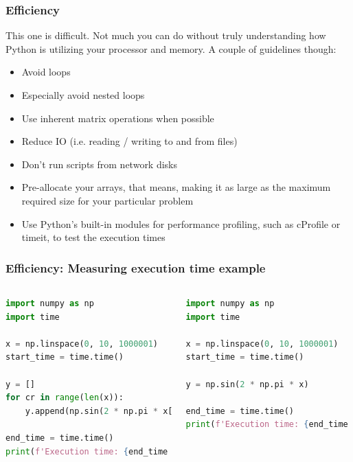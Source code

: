 \begin{frame}[fragile]
  \frametitle{Efficiency}
  This one is difficult. Not much you can do without truly understanding how Python is utilizing your processor and memory. A couple of guidelines though:
  \begin{itemize}
      \item Avoid loops
      \item Especially avoid nested loops
      \item Use inherent matrix operations when possible
      \item Reduce IO (i.e. reading / writing to and from files)
      \item Don't run scripts from network disks
      \item Pre-allocate your arrays, that means, making it as large as the maximum required size for your particular problem
      \item Use Python's built-in modules for performance profiling, such as cProfile or timeit, to test the execution times
  \end{itemize}
\end{frame}

\begin{frame}[fragile]
  \frametitle{Efficiency: Measuring execution time example}
  \begin{columns}
    \begin{lstlisting}[language=Python]
import numpy as np
import time

x = np.linspace(0, 10, 1000001)
start_time = time.time()

y = []
for cr in range(len(x)):
    y.append(np.sin(2 * np.pi * x[cr]))

end_time = time.time()
print(f'Execution time: {end_time - start_time} seconds')
    \end{lstlisting}
    \begin{lstlisting}[language=Python]
import numpy as np
import time

x = np.linspace(0, 10, 1000001)
start_time = time.time()

y = np.sin(2 * np.pi * x)

end_time = time.time()
print(f'Execution time: {end_time - start_time} seconds')
    \end{lstlisting}
  \end{columns}
\end{frame}

